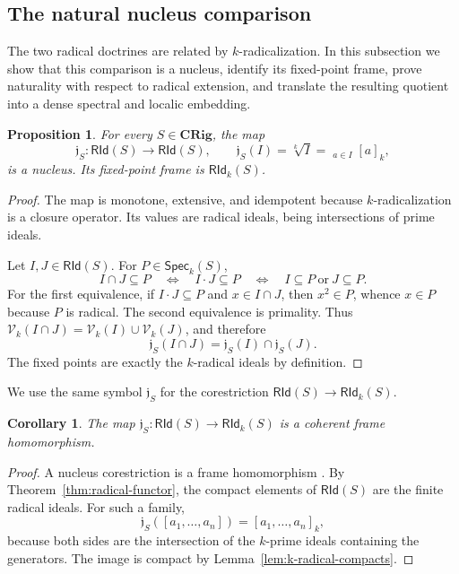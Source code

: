 \documentclass[12pt,leqno]{amsart}
\newcommand{\CRig}{\mathbf{CRig}}
\newcommand{\Speck}{\mathsf{Spec}_{k}}
\newcommand{\RId}{\mathsf{RId}}
\newcommand{\RIdk}{\mathsf{RId}_{k}}
\newtheorem{proposition}[theorem]{Proposition}
\newtheorem{corollary}[theorem]{Corollary}
\theoremstyle{definition}
\numberwithin{equation}{section}
\theoremstyle{remark}
\begin{document}
\subsection{The natural nucleus comparison}\label{subsec:natural-comparison}

The two radical doctrines are related by $k$-radicalization. In this subsection we show that this comparison is a nucleus, identify its fixed-point frame, prove naturality with respect to radical extension, and translate the resulting quotient into a dense spectral and localic embedding.

\begin{proposition}\label{prop:k-radical-nucleus}
For every \(S\in\CRig\), the map
\[
\mathfrak j_S\colon\RId(S)\longrightarrow\RId(S),
\qquad
\mathfrak j_S(I)=\sqrt[k]{I}
 =\mathop{\bigvee_{\!k}}_{a\in I}[a]_k,
\]
is a nucleus. Its fixed-point frame is \(\RIdk(S)\).
\end{proposition}

\begin{proof}
The map is monotone, extensive, and idempotent because $k$-radicalization is a closure operator. Its values are radical ideals, being intersections of prime ideals.

Let \(I,J\in\RId(S)\). For \(P\in\Speck(S)\),
\[
I\cap J\subseteq P
\quad\Longleftrightarrow\quad
I\cdot J\subseteq P
\quad\Longleftrightarrow\quad
I\subseteq P\ \text{or}\ J\subseteq P.
\]
For the first equivalence, if \(I\cdot J\subseteq P\) and \(x\in I\cap J\), then \(x^2\in P\), whence \(x\in P\) because $P$ is radical. The second equivalence is primality. Thus
\(\mathcal V_k(I\cap J)=\mathcal V_k(I)\cup\mathcal V_k(J)\), and therefore
\[
\mathfrak j_S(I\cap J)=\mathfrak j_S(I)\cap\mathfrak j_S(J).
\]
The fixed points are exactly the $k$-radical ideals by definition.
\end{proof}

We use the same symbol \(\mathfrak j_S\) for the corestriction
\(\RId(S)\to\RIdk(S)\).

\begin{corollary}\label{cor:nucleus-coherent-map}
The map \(\mathfrak j_S\colon\RId(S)\to\RIdk(S)\) is a coherent frame homomorphism.
\end{corollary}

\begin{proof}
A nucleus corestriction is a frame homomorphism \cite[Chapter~II, Lemma~2.2]{Johnstone}. By Theorem~\ref{thm:radical-functor}, the compact elements of \(\RId(S)\) are the finite radical ideals. For such a family,
\[
\mathfrak j_S([a_1,\ldots,a_n])=[a_1,\ldots,a_n]_k,
\]
because both sides are the intersection of the $k$-prime ideals containing the generators. The image is compact by Lemma~\ref{lem:k-radical-compacts}.
\end{proof}
\end{document}
